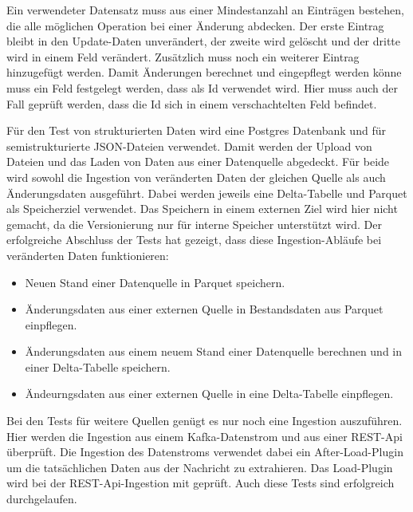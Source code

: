 Ein verwendeter Datensatz muss aus einer Mindestanzahl an Einträgen bestehen, die alle möglichen Operation bei einer Änderung abdecken.
Der erste Eintrag bleibt in den Update-Daten unverändert, der zweite wird gelöscht und der dritte wird in einem Feld verändert.
Zusätzlich muss noch ein weiterer Eintrag hinzugefügt werden.
Damit Änderungen berechnet und eingepflegt werden könne muss ein Feld festgelegt werden, dass als Id verwendet wird.
Hier muss auch der Fall geprüft werden, dass die Id sich in einem verschachtelten Feld befindet.

Für den Test von strukturierten Daten wird eine Postgres Datenbank und für semistrukturierte JSON-Dateien verwendet.
Damit werden der Upload von Dateien und das Laden von Daten aus einer Datenquelle abgedeckt.
Für beide wird sowohl die Ingestion von veränderten Daten der gleichen Quelle als auch Änderungsdaten ausgeführt.
Dabei werden jeweils eine Delta-Tabelle und Parquet als Speicherziel verwendet.
Das Speichern in einem externen Ziel wird hier nicht gemacht, da die Versionierung nur für interne Speicher unterstützt wird.
Der erfolgreiche Abschluss der Tests hat gezeigt, dass diese Ingestion-Abläufe bei veränderten Daten funktionieren: \begin{itemize}
    \item Neuen Stand einer Datenquelle in Parquet speichern.
    \item Änderungsdaten aus einer externen Quelle in Bestandsdaten aus Parquet einpflegen.
    \item Änderungsdaten aus einem neuem Stand einer Datenquelle berechnen und in einer Delta-Tabelle speichern.
    \item Ändeurngsdaten aus einer externen Quelle in eine Delta-Tabelle einpflegen.
\end{itemize}

Bei den Tests für weitere Quellen genügt es nur noch eine Ingestion auszuführen.
Hier werden die Ingestion aus einem Kafka-Datenstrom und aus einer REST-Api überprüft.
Die Ingestion des Datenstroms verwendet dabei ein After-Load-Plugin um die tatsächlichen Daten aus der Nachricht zu extrahieren.
Das Load-Plugin wird bei der REST-Api-Ingestion mit geprüft.
Auch diese Tests sind erfolgreich durchgelaufen.